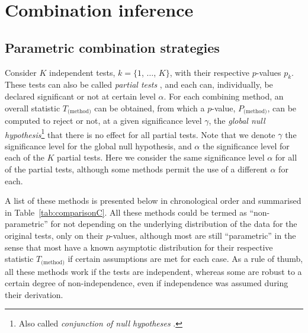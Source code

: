 \chapter{Combination inference}
\label{sec:combination}
\setstretch{\lspac}


\section{Parametric combination strategies}

Consider $K$ independent tests, $k=\{1$, $\ldots$, $K\}$, with their respective $p$-values $p_{k}$. These tests can also be called \emph{partial tests} \citep{Pesarin2010}, and each can, individually, be declared significant or not at certain level $\alpha$. For each combining method, an overall statistic $T_{\text{(method)}}$ can be obtained, from which a $p$-value, $P_{\text{(method)}}$, can be computed to reject or not, at a given significance level $\gamma$, the \emph{global null hypothesis}\footnote{Also called \emph{conjunction of null hypotheses} \citep{Benjamini2008}.} that there is no effect for all partial tests. Note that we denote $\gamma$ the significance level for the global null hypothesis, and $\alpha$ the significance level for each of the $K$ partial tests. Here we consider the same significance level $\alpha$ for all of the partial tests, although some methods permit the use of a different $\alpha$ for each.

A list of these methods is presented below in chronological order and summarised in Table~\ref{tab:comparisonC}. All these methods could be termed as ``non-parametric'' for not depending on the underlying distribution of the data for the original tests, only on their $p$-values, although most are still ``parametric'' in the sense that most have a known asymptotic distribution for their respective statistic $T_{\text{(method)}}$ if certain assumptions are met for each case. As a rule of thumb, all these methods work if the tests are independent, whereas some are robust to a certain degree of non-independence, even if independence was assumed during their derivation.

